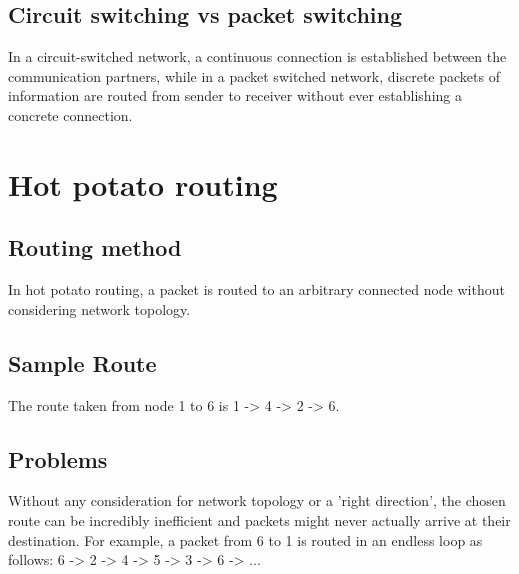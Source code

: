 \documentclass[a4paper, 11 pt, article, accentcolor=tud7b]{tudreport}
\begin{document}
	\subsection*{Circuit switching vs packet switching}
	In a circuit-switched network, a continuous connection is established between the communication partners, while in a packet switched network, discrete packets of information are routed from sender to receiver without ever establishing a concrete connection.
	
  \section{Hot potato routing}
  
  \subsection{Routing method}
  In hot potato routing, a packet is routed to an arbitrary connected node without considering network topology.
  \subsection{Sample Route}
  The route taken from node 1 to 6 is 1 -> 4 -> 2 -> 6.
  \subsection{Problems}
  Without any consideration for network topology or a 'right direction', the chosen route can be incredibly inefficient and packets might never actually arrive at their destination. For example, a packet from 6 to 1 is routed in an endless loop as follows: 6 -> 2 -> 4 -> 5 -> 3 -> 6 -> ...
  
\end{document}
